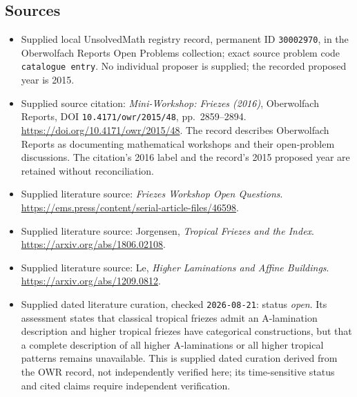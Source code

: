 \documentclass[11pt]{article}
\begin{document}
\subsection{Sources}
\begin{itemize}
\item Supplied local UnsolvedMath registry record, permanent ID \texttt{30002970}, in the Oberwolfach Reports Open Problems collection; exact source problem code \texttt{catalogue entry}. No individual proposer is supplied; the recorded proposed year is 2015.
\item Supplied source citation: \emph{Mini-Workshop: Friezes (2016)}, Oberwolfach Reports, DOI \texttt{10.4171/owr/2015/48}, pp.\ 2859--2894. \url{https://doi.org/10.4171/owr/2015/48}. The record describes Oberwolfach Reports as documenting mathematical workshops and their open-problem discussions. The citation's 2016 label and the record's 2015 proposed year are retained without reconciliation.
\item Supplied literature source: \emph{Friezes Workshop Open Questions}. \url{https://ems.press/content/serial-article-files/46598}.
\item Supplied literature source: Jorgensen, \emph{Tropical Friezes and the Index}. \url{https://arxiv.org/abs/1806.02108}.
\item Supplied literature source: Le, \emph{Higher Laminations and Affine Buildings}. \url{https://arxiv.org/abs/1209.0812}.
\item Supplied dated literature curation, checked \texttt{2026-08-21}: status \emph{open}. Its assessment states that classical tropical friezes admit an A-lamination description and higher tropical friezes have categorical constructions, but that a complete description of all higher A-laminations or all higher tropical patterns remains unavailable. This is supplied dated curation derived from the OWR record, not independently verified here; its time-sensitive status and cited claims require independent verification.
\end{itemize}
\end{document}
